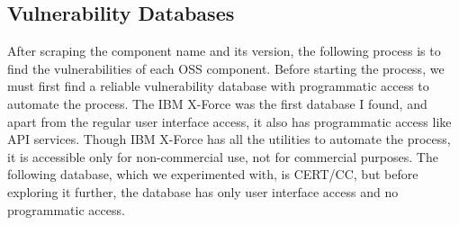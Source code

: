 \subsection{Vulnerability Databases}
After scraping the component name and its version, the following process is to find the vulnerabilities of each \acs{OSS} component. Before starting the process, we must first find a reliable vulnerability database with programmatic access to automate the process. The IBM X-Force was the first database I found, and apart from the regular user interface access, it also has programmatic access like API services. Though IBM X-Force has all the utilities to automate the process, it is accessible only for non-commercial use, not for commercial purposes. The following database, which we experimented with, is CERT/CC, but before exploring it further, the database has only user interface access and no programmatic access.
